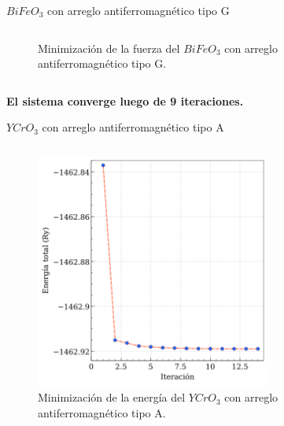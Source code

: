 \begin{frame}{$BiFeO_{3}$ con arreglo antiferromagn\'etico tipo G}
\begin{columns}[t]
\begin{figure}[H]
            \caption{Minimizaci\'on de la fuerza del $BiFeO_{3}$ con arreglo 
                antiferromagn\'etico tipo G.}
        \end{figure}
    \end{columns}
\centering
\textbf{El sistema converge luego de 9 iteraciones.}
\end{frame}


\begin{frame}{$YCrO_{3}$ con arreglo antiferromagn\'etico tipo A}
    \begin{columns}[t]
        \begin{figure}[H]
            \centering
            \includegraphics[width=0.9\textwidth]{contenido/resultados/img_resultados/energia_YCO_A.png}
            \caption{Minimizaci\'on de la energ\'ia del $YCrO_{3}$ con arreglo 
                antiferromagn\'etico tipo A.}
        \end{figure}
        \begin{figure}[H]
            \centering

\end{figure}
\end{columns}
\end{frame}
